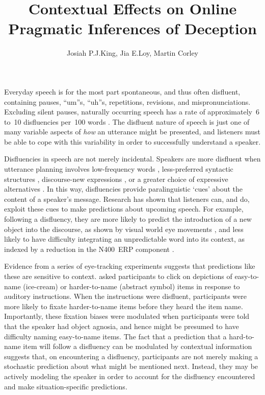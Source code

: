 \documentclass[a4paper,man,natbib]{apa6}
\title{Contextual Effects on Online Pragmatic Inferences of Deception}
\author{Josiah P.\@ J.\@ King, Jia E.\@ Loy, Martin Corley}
\affiliation{Psychology, PPLS, University of Edinburgh}
\newcommand*{\spex}[1]{``{#1}''} %
\begin{document}
\maketitle


\noindent
Everyday speech is for the most part spontaneous, and thus often disfluent, containing pauses, \spex{um}s, \spex{uh}s, repetitions, revisions, and mispronunciations.
Excluding silent pauses, naturally occurring speech has a rate of approximately~6 to~10 disfluencies per~100 words \citep{Bortfeld2001,FoxTree1995}.
The disfluent nature of speech is just one of many variable aspects of \emph{how} an utterance might be presented, and listeners must be able to cope with this variability in order to successfully understand a speaker.

Disfluencies in speech are not merely incidental.  
Speakers are more disfluent when utterance planning involves low-frequency words \citep{Beattie1979}, less-preferred syntactic structures \citep{Cook2009}, discourse-new expressions \citep{arnold2000heaviness}, or a greater choice of expressive alternatives \citep{Schachter1991}.
In this way, disfluencies provide paralinguistic `cues' about the content of a speaker's message.
Research has shown that listeners can, and do, exploit these cues to make predictions about upcoming speech.
For example, following a disfluency, they are more likely to predict the introduction of a new object into the discourse, as shown by visual world eye movements \citep{Arnold2004}, and less likely to have difficulty integrating an unpredictable word into its context, as indexed by a reduction in the N400~ERP component \citep{Corley2007}.

Evidence from a series of eye-tracking experiments suggests that predictions like these are sensitive to context.
\citet{Arnold2007} asked participants to click on depictions of easy-to-name (ice-cream) or harder-to-name (abstract symbol) items in response to auditory instructions.
When the instructions were disfluent, participants were more likely to fixate harder-to-name items before they heard the item name.
Importantly, these fixation biases were modulated when participants were told that the speaker had object agnosia, and hence might be presumed to have difficulty naming easy-to-name items.
The fact that a prediction that a hard-to-name item will follow a disfluency can be modulated by contextual information suggests that, on encountering a disfluency, participants are not merely making a stochastic prediction about what might be mentioned next.
Instead, they may be actively modeling the speaker in order to account for the disfluency encountered and make situation-specific predictions.
\end{document}

